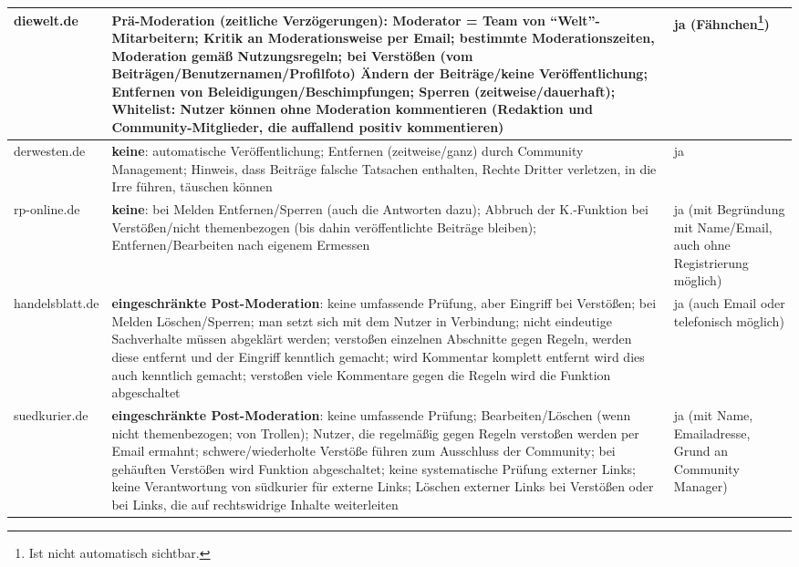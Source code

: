 \begin{landscape}
\begin{longtable}{lp{110mm}p{50mm}}
diewelt.de &
   {\bfseries Prä-Moderation} (zeitliche Verzögerungen): Moderator = Team von
  ``Welt''-Mitarbeitern; Kritik an Moderationsweise per Email; bestimmte
  Moderationszeiten, Moderation gemäß Nutzungsregeln; bei Verstößen (vom
  Beiträgen/Benutzernamen/Profilfoto) Ändern der Beiträge/keine
  Veröffentlichung; Entfernen von Beleidigungen/Beschimpfungen; Sperren
  (zeitweise/dauerhaft); Whitelist: Nutzer können ohne Moderation kommentieren
  (Redaktion und Community-Mitglieder, die auffallend positiv kommentieren) &
  ja (Fähnchen\footnote{Ist nicht automatisch sichtbar.}) \\\midrule

derwesten.de &
   {\bfseries keine}: automatische Veröffentlichung; Entfernen (zeitweise/ganz) durch
  Community Management; Hinweis, dass Beiträge falsche Tatsachen enthalten,
  Rechte Dritter verletzen, in die Irre führen, täuschen können &
  ja \\\midrule

rp-online.de &
   {\bfseries keine}: bei Melden Entfernen/Sperren (auch die Antworten dazu); Abbruch der
  K.-Funktion bei Verstößen/nicht themenbezogen (bis dahin veröffentlichte
  Beiträge bleiben); Entfernen/Bearbeiten nach eigenem Ermessen &
  ja (mit Begründung mit Name/Email, auch ohne Registrierung möglich) \\\midrule

handelsblatt.de &
   {\bfseries eingeschränkte Post-Moderation}: keine umfassende Prüfung, aber Eingriff bei
  Verstößen;  bei Melden Löschen/Sperren; man setzt sich mit dem Nutzer in
  Verbindung; nicht eindeutige Sachverhalte müssen abgeklärt werden; verstoßen
  einzelnen Abschnitte gegen Regeln, werden diese entfernt und der Eingriff
  kenntlich gemacht; wird Kommentar komplett entfernt wird dies auch kenntlich
  gemacht; verstoßen viele Kommentare gegen die Regeln wird die Funktion
  abgeschaltet &
  ja (auch Email oder telefonisch möglich) \\\midrule

suedkurier.de &
   {\bfseries eingeschränkte Post-Moderation}: keine umfassende Prüfung;  Bearbeiten/Löschen
  (wenn nicht themenbezogen; von Trollen); Nutzer, die regelmäßig gegen Regeln
  verstoßen werden per Email ermahnt; schwere/wiederholte Verstöße führen zum
  Ausschluss der Community; bei gehäuften Verstößen wird Funktion abgeschaltet;
  keine systematische Prüfung externer Links; keine Verantwortung von südkurier
  für externe Links; Löschen externer Links bei Verstößen oder bei Links, die
  auf rechtswidrige Inhalte weiterleiten &
  ja (mit Name, Emailadresse, Grund an Community Manager) \\\midrule


\end{longtable}
\end{landscape}
